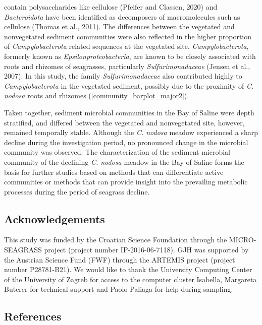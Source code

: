\documentclass[12pt,]{article}
\begin{document}
contain polysaccharides like cellulose (Pfeifer and Classen, 2020) and
\emph{Bacteroidota} have been identified as decomposers of
macromolecules such as cellulose (Thomas et al., 2011). The differences
between the vegetated and nonvegetated sediment communities were also
reflected in the higher proportion of \emph{Campylobacterota} related
sequences at the vegetated site. \emph{Campylobacterota}, formerly known
as \emph{Epsilonproteobacteria}, are known to be closely associated with
roots and rhizomes of seagrasses, particularly \emph{Sulfurimonadaceae}
(Jensen et al., 2007). In this study, the family
\emph{Sulfurimonadaceae} also contributed highly to
\emph{Campylobacterota} in the vegetated sediment, possibly due to the
proximity of \emph{C. nodosa} roots and rhizomes
(\autoref {community_barplot_major2}).

Taken together, sediment microbial communities in the Bay of Saline were
depth stratified, and differed between the vegetated and nonvegetated
site, however, remained temporally stable. Although the \emph{C. nodosa}
meadow experienced a sharp decline during the investigation period, no
pronounced change in the microbial community was observed. The
characterization of the sediment microbial community of the declining
\emph{C. nodosa} meadow in the Bay of Saline forms the basis for further
studies based on methods that can differentiate active communities or
methods that can provide insight into the prevailing metabolic processes
during the period of seagrass decline.

\newpage

\hypertarget{acknowledgements}{%
\subsection{Acknowledgements}\label{acknowledgements}}

This study was funded by the Croatian Science Foundation through the
MICRO-SEAGRASS project (project number IP-2016-06-7118). GJH was
supported by the Austrian Science Fund (FWF) through the ARTEMIS project
(project number P28781-B21). We would like to thank the University
Computing Center of the University of Zagreb for access to the computer
cluster Isabella, Margareta Buterer for technical support and Paolo
Paliaga for help during sampling.

\newpage

\newpage

\hypertarget{references}{%
\subsection{References}\label{references}}
\end{document}
